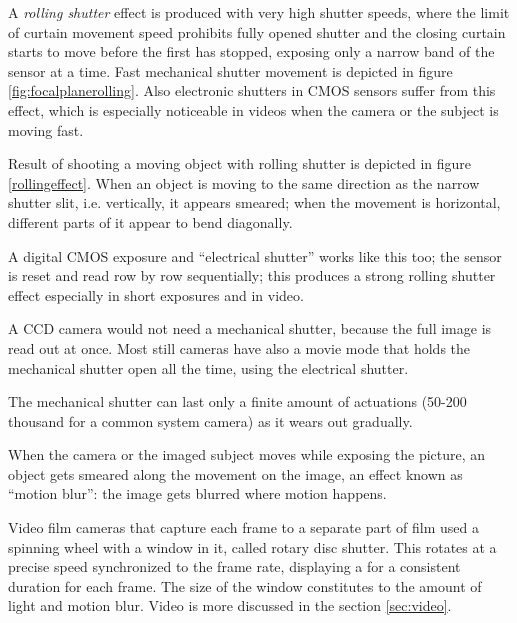 A \emph{rolling shutter} effect is produced with very high shutter speeds, where the limit of curtain movement speed prohibits fully opened shutter and the closing curtain starts to move before the first has stopped, exposing only a narrow band of the sensor at a time.
Fast mechanical shutter movement is depicted in figure \ref{fig:focalplanerolling}.
Also electronic shutters in CMOS sensors suffer from this effect, which is especially noticeable in videos when the camera or the subject is moving fast.

Result of shooting a moving object with rolling shutter is depicted in figure \ref{rollingeffect}.
When an object is moving to the same direction as the narrow shutter slit, i.e. vertically, it appears smeared;
when the movement is horizontal, different parts of it appear to bend diagonally.




A digital CMOS exposure and ``electrical shutter'' works like this too; the sensor is reset and read row by row sequentially; this produces a strong rolling shutter effect especially in short exposures and in video.

A CCD camera would not need a mechanical shutter, because the full image is read out at once.
Most still cameras have also a movie mode that holds the mechanical shutter open all the time, using the electrical shutter.

The mechanical shutter can last only a finite amount of actuations (50-200 thousand for a common system camera) as it wears out gradually.

%



When the camera or the imaged subject moves while exposing the picture, an object gets smeared along the movement on the image, an effect known as ``motion blur'': the image gets blurred where motion happens.

Video film cameras that capture each frame to a separate part of film used a spinning wheel with a window in it, called rotary disc shutter. \cite{wilson2004anton}
This rotates at a precise speed synchronized to the frame rate, displaying a for a consistent duration for each frame.
The size of the window constitutes to the amount of light and motion blur. Video is more discussed in the section \ref{sec:video}.


